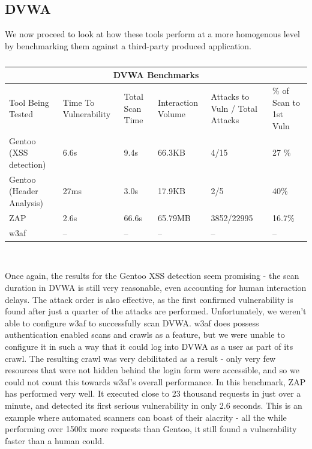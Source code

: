 \subsection{DVWA}

We now proceed to look at how these tools perform at a more homogenous level by benchmarking them against a third-party produced application. \\
\begin{table}[h]
	
	{

		\captionsetup{justification=centering}		
		\caption{}
		\label{table:dvwa_benchmarks}
		\begin{tabular}{ |p{4cm}||p{1.4cm}|p{1.4cm}|p{1.6cm}|p{2cm}|p{2cm}| }
			\hline
			\multicolumn{6}{|c|}{\textbf{DVWA Benchmarks}} \\ [0.5ex]
			\hline \hline 
			Tool Being Tested& Time To Vulnerability & Total Scan Time & Interaction Volume & Attacks to Vuln / Total Attacks & \% of Scan to 1st Vuln \\
			\hline
			Gentoo (XSS detection)    & 6.6s      & 9.4s    &   66.3KB          & 4/15 & 27 \% \\
			Gentoo (Header Analysis) & 27ms    &  3.0s    & 17.9KB   &  2/5 & 40\%\\
			ZAP                                  & 2.6s & 66.6s     &  65.79MB & 3852/22995& 16.7\%\\ 
			w3af                                 & -- & -- & -- & -- &-- \\
			\hline
		\end{tabular}
	} \\
\end{table}

Once again, the results for the Gentoo XSS detection seem promising - the scan duration in DVWA is still very reasonable, even accounting for human interaction delays. The attack order is also effective, as the first confirmed vulnerability is found after just a quarter of the attacks are performed. Unfortunately, we weren't able to configure w3af to successfully scan DVWA. w3af does possess authentication enabled scans and crawls as a feature, but we were unable to configure it in such a way that it could log into DVWA as a user as part of its crawl. The resulting crawl was very debilitated as a result - only very few resources that were not hidden behind the login form were accessible, and so we could not count this towards w3af's overall performance. In this benchmark, ZAP has performed very well. It executed close to 23 thousand requests in just over a minute, and detected its first serious vulnerability in only 2.6 seconds. This is an example where automated scanners can boast of their alacrity - all the while performing over 1500x more requests than Gentoo, it still found a vulnerability faster than a human could. \\

